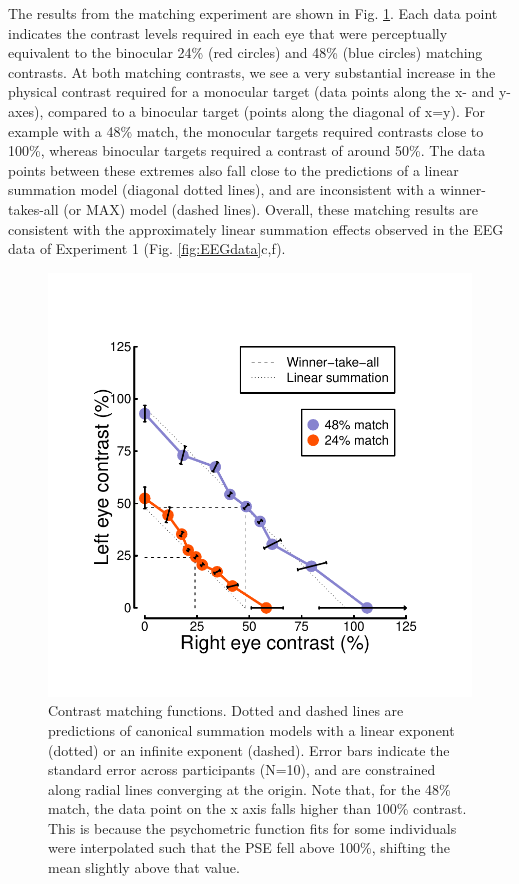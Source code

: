 \documentclass[
]{article}
\begin{document}
The results from the matching experiment are shown in Fig. \ref{fig:matchingdata}. Each data point indicates the contrast levels required in each eye that were perceptually equivalent to the binocular 24\% (red circles) and 48\% (blue circles) matching contrasts. At both matching contrasts, we see a very substantial increase in the physical contrast required for a monocular target (data points along the x- and y-axes), compared to a binocular target (points along the diagonal of x=y). For example with a 48\% match, the monocular targets required contrasts close to 100\%, whereas binocular targets required a contrast of around 50\%. The data points between these extremes also fall close to the predictions of a linear summation model (diagonal dotted lines), and are inconsistent with a winner-takes-all (or MAX) model (dashed lines). Overall, these matching results are consistent with the approximately linear summation effects observed in the EEG data of Experiment 1 (Fig. \ref{fig:EEGdata}c,f).

\begin{figure}

{\centering \includegraphics[width=0.5\linewidth]{Figures/matchingdata} 

}

\caption{Contrast matching functions. Dotted and dashed lines are predictions of canonical summation models with a linear exponent (dotted) or an infinite exponent (dashed). Error bars indicate the standard error across participants (N=10), and are constrained along radial lines converging at the origin. Note that, for the {48\%} match, the data point on the x axis falls higher than {100\%} contrast. This is because the psychometric function fits for some individuals were interpolated such that the PSE fell above {100\%}, shifting the mean slightly above that value.}\label{fig:matchingdata}
\end{figure}
\end{document}
